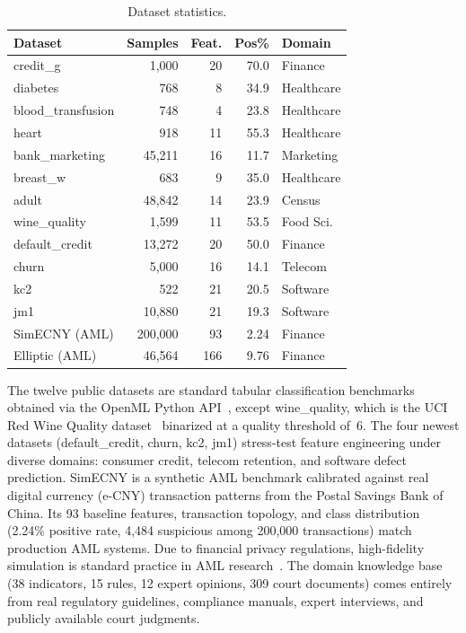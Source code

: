\begin{table}[t]
\centering
\caption{Dataset statistics.}
\label{tab:datasets}
\small
\renewcommand{\arraystretch}{1.2}
\setlength{\tabcolsep}{3pt}
\begin{tabular}{l r r r l}
\hline
\textbf{Dataset} & \textbf{Samples} & \textbf{Feat.} & \textbf{Pos\%} & \textbf{Domain} \\
\hline
credit\_g          & 1,000   & 20  & 70.0 & Finance \\
diabetes           & 768     & 8   & 34.9 & Healthcare \\
blood\_transfusion & 748     & 4   & 23.8 & Healthcare \\
heart              & 918     & 11  & 55.3 & Healthcare \\
bank\_marketing    & 45,211  & 16  & 11.7 & Marketing \\
breast\_w          & 683     & 9   & 35.0 & Healthcare \\
adult              & 48,842  & 14  & 23.9 & Census \\
wine\_quality      & 1,599   & 11  & 53.5 & Food Sci. \\
default\_credit    & 13,272  & 20  & 50.0 & Finance \\
churn              & 5,000   & 16  & 14.1 & Telecom \\
kc2                & 522     & 21  & 20.5 & Software \\
jm1                & 10,880  & 21  & 19.3 & Software \\
\hline
SimECNY (AML)      & 200,000 & 93  & 2.24 & Finance \\
Elliptic (AML)     & 46,564  & 166 & 9.76 & Finance \\
\hline
\end{tabular}
\end{table}

The twelve public datasets are standard tabular classification benchmarks obtained via the OpenML Python API~\cite{vanschoren2014openml}, except wine\_quality, which is the UCI Red Wine Quality dataset~\cite{cortez2009wine} binarized at a quality threshold of~6. The four newest datasets (default\_credit, churn, kc2, jm1) stress-test feature engineering under diverse domains: consumer credit, telecom retention, and software defect prediction. SimECNY is a synthetic AML benchmark calibrated against real digital currency (e-CNY) transaction patterns from the Postal Savings Bank of China. Its 93 baseline features, transaction topology, and class distribution (2.24\% positive rate, 4{,}484 suspicious among 200{,}000 transactions) match production AML systems. Due to financial privacy regulations, high-fidelity simulation is standard practice in AML research~\cite{weber2019anti}. The domain knowledge base (38 indicators, 15 rules, 12 expert opinions, 309 court documents) comes entirely from real regulatory guidelines, compliance manuals, expert interviews, and publicly available court judgments.

